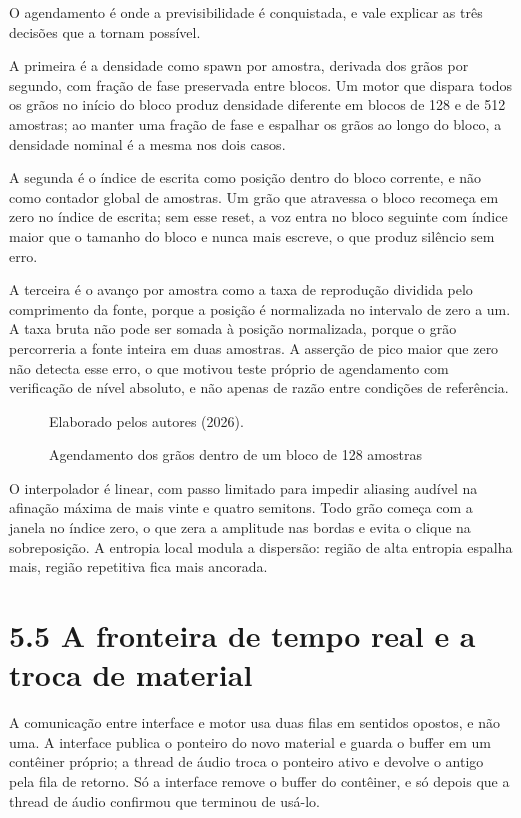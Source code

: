 \documentclass[12pt,a4paper]{article}
\begin{document}
O agendamento é onde a previsibilidade é conquistada, e vale explicar as três decisões que a tornam possível.


A primeira é a densidade como spawn por amostra, derivada dos grãos por segundo, com fração de fase preservada entre blocos. Um motor que dispara todos os grãos no início do bloco produz densidade diferente em blocos de 128 e de 512 amostras; ao manter uma fração de fase e espalhar os grãos ao longo do bloco, a densidade nominal é a mesma nos dois casos.


A segunda é o índice de escrita como posição dentro do bloco corrente, e não como contador global de amostras. Um grão que atravessa o bloco recomeça em zero no índice de escrita; sem esse reset, a voz entra no bloco seguinte com índice maior que o tamanho do bloco e nunca mais escreve, o que produz silêncio sem erro.


A terceira é o avanço por amostra como a taxa de reprodução dividida pelo comprimento da fonte, porque a posição é normalizada no intervalo de zero a um. A taxa bruta não pode ser somada à posição normalizada, porque o grão percorreria a fonte inteira em duas amostras. A asserção de pico maior que zero não detecta esse erro, o que motivou teste próprio de agendamento com verificação de nível absoluto, e não apenas de razão entre condições de referência.


\begin{figure}
\centering
\resizebox{\textwidth}{!}{}
\caption{Agendamento dos grãos dentro de um bloco de 128 amostras}
\label{fig:agendamento}
{\footnotesize Elaborado pelos autores (2026).\par}
\end{figure}

O interpolador é linear, com passo limitado para impedir aliasing audível na afinação máxima de mais vinte e quatro semitons. Todo grão começa com a janela no índice zero, o que zera a amplitude nas bordas e evita o clique na sobreposição. A entropia local modula a dispersão: região de alta entropia espalha mais, região repetitiva fica mais ancorada.


\section*{5.5 A fronteira de tempo real e a troca de material}

A comunicação entre interface e motor usa duas filas em sentidos opostos, e não uma. A interface publica o ponteiro do novo material e guarda o buffer em um contêiner próprio; a thread de áudio troca o ponteiro ativo e devolve o antigo pela fila de retorno. Só a interface remove o buffer do contêiner, e só depois que a thread de áudio confirmou que terminou de usá-lo.
\end{document}
